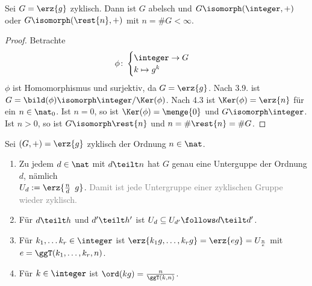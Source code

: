 %
\begin{satz}
	Sei $G = \erz{g}$ zyklisch. Dann ist $G$ abelsch und $G \isomorph (\integer,+)$ oder $G \isomorph (\rest{n}, +)$ mit $n = \# G < \infty$.
\end{satz}
\begin{proof}
	Betrachte
	\begin{align*}
		\phi \colon \begin{cases} \integer \to G \\ k \mapsto g^k \end{cases}
	\end{align*}
	$\phi$ ist Homomorphismus und surjektiv, da $G = \erz{g}$. Nach 3.9. ist $G = \bild(\phi) \isomorph \integer / \Ker(\phi)$. Nach 4.3 ist $\Ker(\phi)  = \erz{n}$ für ein $n \in \nat_0$. Ist $n=0$, so ist $\Ker(\phi) = \menge{0}$ und $G \isomorph \integer$. Ist $n > 0$, so ist $G \isomorph \rest{n}$ und $n = \# \rest{n} = \# G$.
\end{proof}
%
\begin{satz}
	Sei $(G,+) = \erz{g}$ zyklisch der Ordnung $n \in \nat$.
	\begin{enumerate}
		\item Zu jedem $d \in \nat$ mit $d \teilt n$ hat $G$ genau eine Unterguppe der Ordnung $d$, nämlich \\
		$U_d := \erz{\frac{n}{d} \enspace g}$. \textcolor{gray}{Damit ist jede Untergruppe einer zyklischen Gruppe wieder zyklisch.}
		\item Für $d \teilt h$ und $d' \teilt h'$ ist $U_d \subseteq U_{d'} \follows d \teilt d'$.
		\item Für $k_1 , \dots k_r \in \integer$ ist $\erz{k_1g, \dots , k_r g} = \erz{eg} = U_{\frac{n}{e}}$ mit $e = \ggT(k_1, \dots , k_r , n)$.
		\item Für $k \in \integer$ ist $\ord(kg) = \frac{n}{\ggT(k,n)}$.
	\end{enumerate}
\end{satz}
